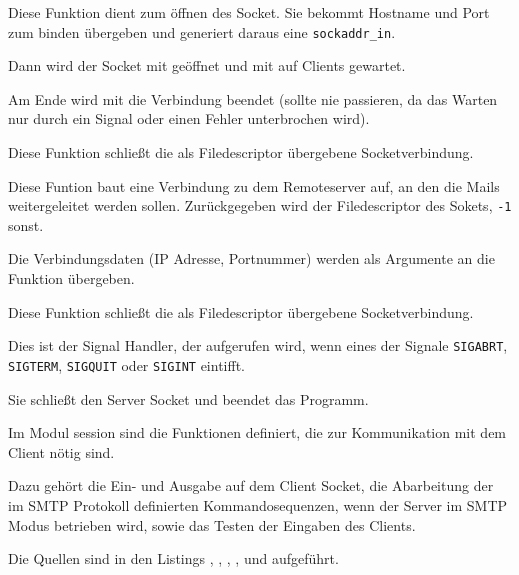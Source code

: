 \label{fn:create_conn}
Diese Funktion dient zum \"{o}ffnen des Socket. Sie bekommt Hostname und Port zum binden \"{u}bergeben und generiert daraus eine \texttt{sockaddr\_in}.

Dann wird der Socket mit  ge\"{o}ffnet und mit  auf Clients gewartet.

Am Ende wird mit  die Verbindung beendet (sollte nie passieren, da das Warten nur durch ein Signal oder einen Fehler unterbrochen wird).


\label{fn:quit_conn}
Diese Funktion schließt die als Filedescriptor \"{u}bergebene Socketverbindung.


\label{fn:create_remote_conn}
Diese Funtion baut eine Verbindung zu dem Remoteserver auf, an den die Mails weitergeleitet werden sollen. Zur\"{u}ckgegeben wird der Filedescriptor des Sokets, \texttt{-1} sonst.

Die Verbindungsdaten (IP Adresse, Portnummer) werden als Argumente an die Funktion \"{u}bergeben.

\label{fn:quit_remote_conn}
Diese Funktion schließt die als Filedescriptor \"{u}bergebene Socketverbindung.

\label{fn:sig_abrt_conn}
Dies ist der Signal Handler, der aufgerufen wird, wenn eines der Signale \texttt{SIGABRT}, \texttt{SIGTERM}, \texttt{SIGQUIT} oder \texttt{SIGINT} eintifft. 

Sie schließt den Server Socket und beendet das Programm.





\label{mod:session}
Im Modul session sind die Funktionen definiert, die zur Kommunikation mit dem Client n\"{o}tig sind. 

Dazu geh\"{o}rt die Ein- und Ausgabe auf dem Client Socket, die Abarbeitung der im SMTP Protokoll definierten Kommandosequenzen, wenn der Server im SMTP Modus betrieben wird, sowie das Testen der Eingaben des Clients.

Die Quellen sind in den Listings , , , ,  und  aufgef\"{u}hrt.

